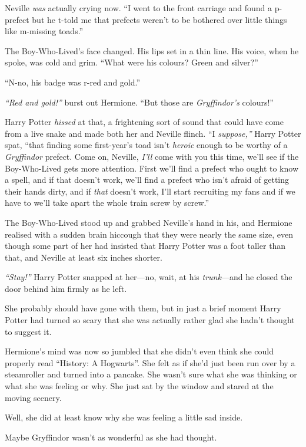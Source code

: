 Neville \emph{was} actually crying now. ``I went to the front carriage
and found a p-prefect but he t-told me that prefects weren't to be
bothered over little things like m-missing toads.''

The Boy-Who-Lived's face changed. His lips set in a thin line. His
voice, when he spoke, was cold and grim. ``What were his colours? Green
and silver?''

``N-no, his badge was r-red and gold.''

\emph{``Red and gold!''} burst out Hermione. ``But those are
\emph{Gryffindor's} colours!''

Harry Potter \emph{hissed} at that, a frightening sort of sound that
could have come from a live snake and made both her and Neville flinch.
``I \emph{suppose,''} Harry Potter spat, ``that finding some
first-year's toad isn't \emph{heroic} enough to be worthy of a
\emph{Gryffindor} prefect. Come on, Neville, \emph{I'll} come with you
this time, we'll see if the Boy-Who-Lived gets more attention. First
we'll find a prefect who ought to know a spell, and if that doesn't
work, we'll find a prefect who isn't afraid of getting their hands
dirty, and if \emph{that} doesn't work, I'll start recruiting my fans
and if we have to we'll take apart the whole train screw by screw.''

The Boy-Who-Lived stood up and grabbed Neville's hand in his, and
Hermione realised with a sudden brain hiccough that they were nearly the
same size, even though some part of her had insisted that Harry Potter
was a foot taller than that, and Neville at least six inches shorter.

\emph{``Stay!''} Harry Potter snapped at her---no, wait, at his
\emph{trunk}---and he closed the door behind him firmly as he left.

She probably should have gone with them, but in just a brief moment
Harry Potter had turned so scary that she was actually rather glad she
hadn't thought to suggest it.

Hermione's mind was now so jumbled that she didn't even think she could
properly read ``History: A Hogwarts''. She felt as if she'd just been
run over by a steamroller and turned into a pancake. She wasn't sure
what she was thinking or what she was feeling or why. She just sat by
the window and stared at the moving scenery.

Well, she did at least know why she was feeling a little sad inside.

Maybe Gryffindor wasn't as wonderful as she had thought.

